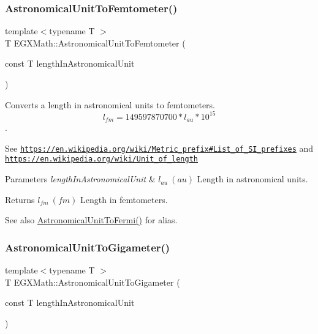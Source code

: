 \subsubsection{\texorpdfstring{Astronomical\+Unit\+To\+Femtometer()}{AstronomicalUnitToFemtometer()}}
{\footnotesize\ttfamily template$<$typename T $>$ \\
T E\+G\+X\+Math\+::\+Astronomical\+Unit\+To\+Femtometer (\begin{DoxyParamCaption}\item[{const T}]{length\+In\+Astronomical\+Unit }\end{DoxyParamCaption})}



Converts a length in astronomical units to femtometers. \[ l_{fm}=149597870700 * l_{au} * 10^{15} \]. 

See \href{https://en.wikipedia.org/wiki/Metric_prefix#List_of_SI_prefixes}{\tt https\+://en.\+wikipedia.\+org/wiki/\+Metric\+\_\+prefix\#\+List\+\_\+of\+\_\+\+S\+I\+\_\+prefixes} and \href{https://en.wikipedia.org/wiki/Unit_of_length}{\tt https\+://en.\+wikipedia.\+org/wiki/\+Unit\+\_\+of\+\_\+length} 
\begin{DoxyParams}{Parameters}
{\em length\+In\+Astronomical\+Unit} & $ l_{au}\ (au)$ Length in astronomical units. \\
\hline
\end{DoxyParams}
\begin{DoxyReturn}{Returns}
$ l_{fm}\ (fm)$ Length in femtometers. 
\end{DoxyReturn}
\begin{DoxySeeAlso}{See also}
\mbox{\hyperlink{group___e_g_x_math-_conversions-_length_conversions-_astronomical-_astronomical_unit-_non-_s_i_gacdf3c6bc0a49c0602d659161e6910bec}{Astronomical\+Unit\+To\+Fermi()}} for alias. 
\end{DoxySeeAlso}
\mbox{\label{group___e_g_x_math-_conversions-_length_conversions-_astronomical-_astronomical_unit-_s_i_ga8f063e63221d46cfb027d43bf3a03aa3}} 
\subsubsection{\texorpdfstring{Astronomical\+Unit\+To\+Gigameter()}{AstronomicalUnitToGigameter()}}
{\footnotesize\ttfamily template$<$typename T $>$ \\
T E\+G\+X\+Math\+::\+Astronomical\+Unit\+To\+Gigameter (\begin{DoxyParamCaption}\item[{const T}]{length\+In\+Astronomical\+Unit }\end{DoxyParamCaption})}



